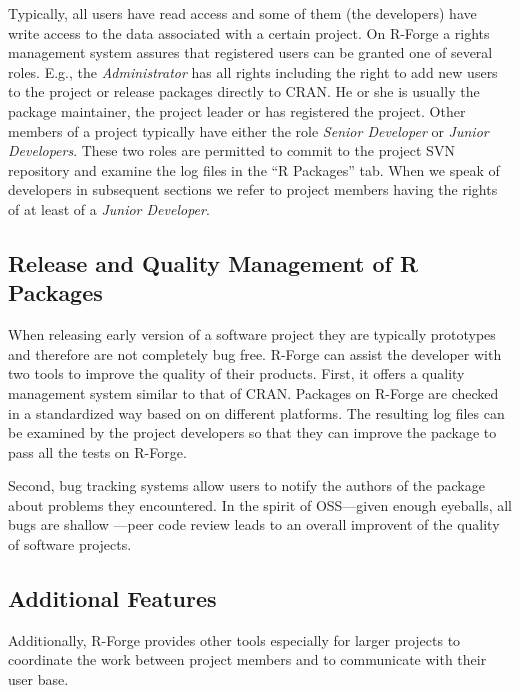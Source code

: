 
Typically, all users have read access and some of them (the
developers) have write access to the data associated with
a certain project. On R-Forge a rights management system assures that
registered users can be granted one of several roles. 
E.g., the \textit{Administrator} has all rights including the right to
add new users to the project or release packages directly to CRAN. He
or she is usually the package 
maintainer, the project leader or has registered the project.
Other members of a project typically have either the role \textit{Senior 
Developer} or \textit{Junior Developers}. These two roles are
permitted to commit to the project 
SVN repository and examine the log files in the ``R Packages'' tab.
When we speak of developers in subsequent sections we refer to project
members having the rights of at least of a \textit{Junior Developer}.


\subsection{Release and Quality Management of R Packages}
\label{sec:release_and_quality_management}
When releasing early version of a software project they are typically
prototypes and therefore are 
not completely bug free. R-Forge can assist the developer with two
tools to improve the quality of their products. First, it offers a
quality management system similar to 
that of CRAN. Packages on R-Forge are checked in a
standardized way based on  on different
platforms. The resulting log files can be examined by the project
developers so that they can improve the package to pass all the tests
on R-Forge.

Second, bug tracking systems allow users  to notify
the authors of the package about problems they encountered. 
In the spirit of OSS---given
enough eyeballs, all bugs are shallow
\citep{forge:Raymond:1999}---peer code review leads to an 
overall improvent of the quality of software projects.

\subsection{Additional Features}

Additionally, R-Forge provides other tools especially for larger
projects to coordinate the work between project members and to
communicate with their user base.


